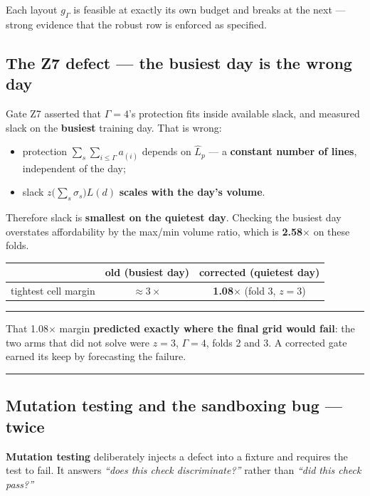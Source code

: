 \documentclass[11pt,a4paper]{article}
\newenvironment{keybox}
  {\par\medskip\noindent\rule{\linewidth}{0.9pt}\par\nobreak\smallskip\ignorespaces}
  {\par\smallskip\nobreak\noindent\rule{\linewidth}{0.9pt}\par\medskip}
\begin{document}
Each layout $g_\Gamma$ is feasible at exactly its own budget and breaks at the
next --- strong evidence that the robust row is enforced as specified.

\subsection{The Z7 defect --- the busiest day is the wrong day}

Gate Z7 asserted that $\Gamma=4$'s protection fits inside available slack, and
measured slack on the \textbf{busiest} training day. That is wrong:

\begin{itemize}
  \item protection $\sum_s\sum_{i\le\Gamma}a_{(i)}$ depends on $\hat L_p$ --- a
        \textbf{constant number of lines}, independent of the day;
  \item slack $z\bigl(\sum_s\sigma_s\bigr)L(d)$ \textbf{scales with the day's volume}.
\end{itemize}

Therefore slack is \textbf{smallest on the quietest day}. Checking the busiest
day overstates affordability by the max/min volume ratio, which is
\textbf{2.58$\times$} on these folds.

\begin{center}
\begin{tabular}{lcc}
\toprule
 & old (busiest day) & corrected (quietest day) \\
\midrule
tightest cell margin & $\approx3\times$ & \textbf{1.08$\times$} (fold 3, $z=3$) \\
\bottomrule
\end{tabular}
\end{center}

\begin{keybox}
That 1.08$\times$ margin \textbf{predicted exactly where the final grid would
fail}: the two arms that did not solve were $z=3$, $\Gamma=4$, folds 2 and 3. A
corrected gate earned its keep by forecasting the failure.
\end{keybox}

\subsection{Mutation testing and the sandboxing bug --- twice}

\textbf{Mutation testing} deliberately injects a defect into a fixture and
requires the test to fail. It answers \emph{``does this check discriminate?''}
rather than \emph{``did this check pass?''}
\end{document}
